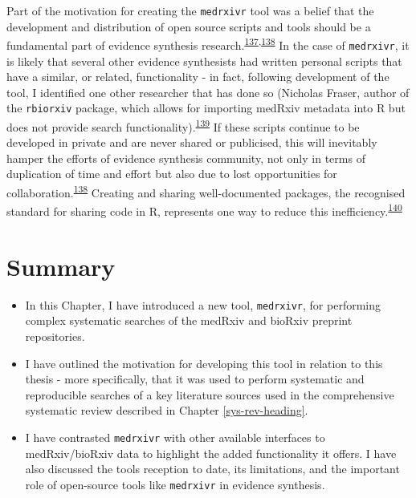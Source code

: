 \documentclass[a4paper, twoside]{templates/ociamthesis}
\begin{document}
Part of the motivation for creating the \texttt{medrxivr} tool was a belief that the development and distribution of open source scripts and tools should be a fundamental part of evidence synthesis research.\textsuperscript{\protect\hyperlink{ref-goldacre2019}{137},\protect\hyperlink{ref-mckiernan2016}{138}} In the case of \texttt{medrxivr}, it is likely that several other evidence synthesists had written personal scripts that have a similar, or related, functionality - in fact, following development of the tool, I identified one other researcher that has done so (Nicholas Fraser, author of the \texttt{rbiorxiv} package, which allows for importing medRxiv metadata into R but does not provide search functionality).\textsuperscript{\protect\hyperlink{ref-fraser2020rbiorixv}{139}} If these scripts continue to be developed in private and are never shared or publicised, this will inevitably hamper the efforts of evidence synthesis community, not only in terms of duplication of time and effort but also due to lost opportunities for collaboration.\textsuperscript{\protect\hyperlink{ref-mckiernan2016}{138}} Creating and sharing well-documented packages, the recognised standard for sharing code in R, represents one way to reduce this inefficiency.\textsuperscript{\protect\hyperlink{ref-vuorre2020}{140}}

\hypertarget{summary-1}{%
\section{Summary}\label{summary-1}}

\begin{itemize}
\item
  In this Chapter, I have introduced a new tool, \texttt{medrxivr}, for performing complex systematic searches of the medRxiv and bioRxiv preprint repositories.
\item
  I have outlined the motivation for developing this tool in relation to this thesis - more specifically, that it was used to perform systematic and reproducible searches of a key literature sources used in the comprehensive systematic review described in Chapter \ref{sys-rev-heading}.
\item
  I have contrasted \texttt{medrxivr} with other available interfaces to medRxiv/bioRxiv data to highlight the added functionality it offers. I have also discussed the tools reception to date, its limitations, and the important role of open-source tools like \texttt{medrxivr} in evidence synthesis.
\end{itemize}
\end{document}

